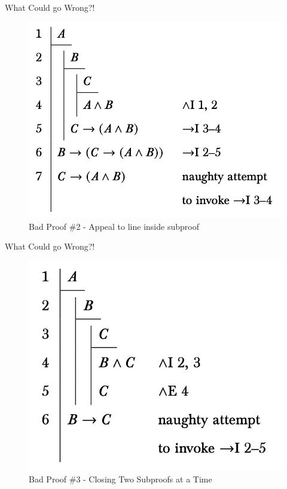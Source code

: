 \documentclass[
  ignorenonframetext,
]{beamer}
\renewcommand{\,}{\text{, }}
\begin{document}
\begin{frame}{What Could go Wrong?!}
\protect\hypertarget{what-could-go-wrong-1}{}
\begin{figure}
\centering
\includegraphics[width=\textwidth,height=0.65\textheight]{5_1c.png}
\caption{Bad Proof \#2 - Appeal to line inside subproof}
\end{figure}
\end{frame}

\begin{frame}{What Could go Wrong?!}
\protect\hypertarget{what-could-go-wrong-2}{}
\begin{figure}
\centering
\includegraphics[width=\textwidth,height=0.65\textheight]{5_1d.png}
\caption{Bad Proof \#3 - Closing Two Subproofs at a Time}
\end{figure}
\end{frame}
\end{document}
